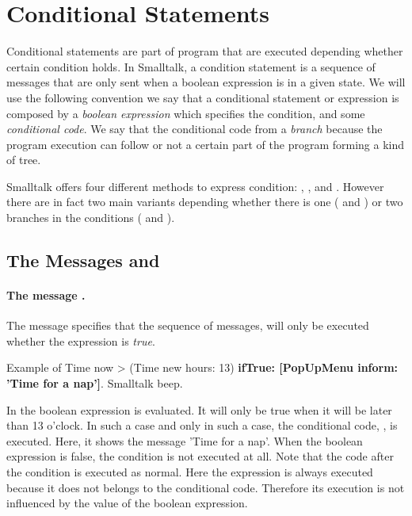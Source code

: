 \section{Conditional Statements}
Conditional statements are part of program that are executed depending whether certain condition holds. In Smalltalk, a condition statement is a sequence of messages that are only sent  when a boolean expression is in a given state. We will use the following convention we say that a conditional statement or expression is composed by a \textit{boolean expression} which specifies the condition, and some \textit{conditional code}. We say that  the conditional code from a \textit{branch} because the program execution can follow or not a certain part of the program forming a kind of tree.

Smalltalk offers four different methods to express condition:   ,    , and   . However there are in fact two main variants  depending whether there is one ( and ) or two branches in the conditions ( and ). 

\subsection{The Messages  and }
\paragraph{The message .} The message  specifies that  the sequence of messages,  will only be executed whether the expression  is \textit{true}. 

\begin{scriptwithtitle}{Example of }\label{scr:iftrueExample}
Time now > (Time new hours: 13)
   \textbf{ifTrue: [PopUpMenu inform: 'Time for a nap']}.
Smalltalk beep. 
\end{scriptwithtitle}

In  the boolean expression  is evaluated. 
It will only be true when it will be  later than 13 o'clock. In such a case and only in such a case, the conditional code, , is executed. Here, it  shows the message 'Time for a nap'. When the boolean expression is false, the condition is not executed at all. Note that the code after the condition is executed as normal. Here the expression  is always executed because it does not belongs to the conditional code. Therefore its execution is not influenced by the value of the boolean expression. 

